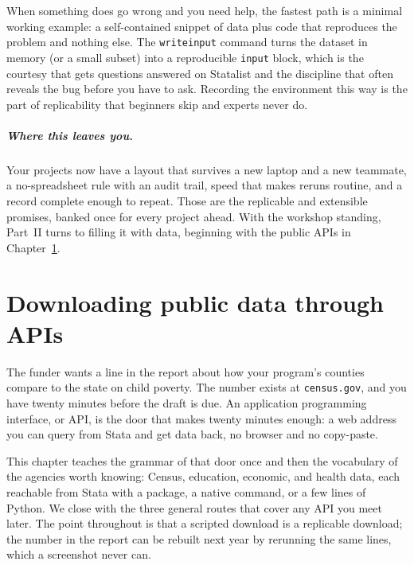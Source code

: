 \documentclass[
    a4paper,
    fontsize=10pt,
    twoside=true,
    numbers=noenddot,
]{kaobook}
\begin{document}
When something does go wrong and you need help, the fastest path is a minimal working example: a self-contained snippet of data plus code that reproduces the problem and nothing else. The \texttt{writeinput} command turns the dataset in memory (or a small subset) into a reproducible \texttt{input} block, which is the courtesy that gets questions answered on Statalist and the discipline that often reveals the bug before you have to ask. Recording the environment this way is the part of replicability that beginners skip and experts never do.

\paragraph{Where this leaves you.} Your projects now have a layout that survives a new laptop and a new teammate, a no-spreadsheet rule with an audit trail, speed that makes reruns routine, and a record complete enough to repeat. Those are the replicable and extensible promises, banked once for every project ahead. With the workshop standing, Part~II turns to filling it with data, beginning with the public APIs in Chapter~\ref{ch:apis}.



\chapter{Downloading public data through APIs}\label{ch:apis}

The funder wants a line in the report about how your program's counties compare to the state on child poverty. The number exists at \texttt{census.gov}, and you have twenty minutes before the draft is due. An application programming interface, or API, is the door that makes twenty minutes enough: a web address you can query from Stata and get data back, no browser and no copy-paste.

This chapter teaches the grammar of that door once and then the vocabulary of the agencies worth knowing: Census, education, economic, and health data, each reachable from Stata with a package, a native command, or a few lines of Python. We close with the three general routes that cover any API you meet later. The point throughout is that a scripted download is a replicable download; the number in the report can be rebuilt next year by rerunning the same lines, which a screenshot never can.
\end{document}
